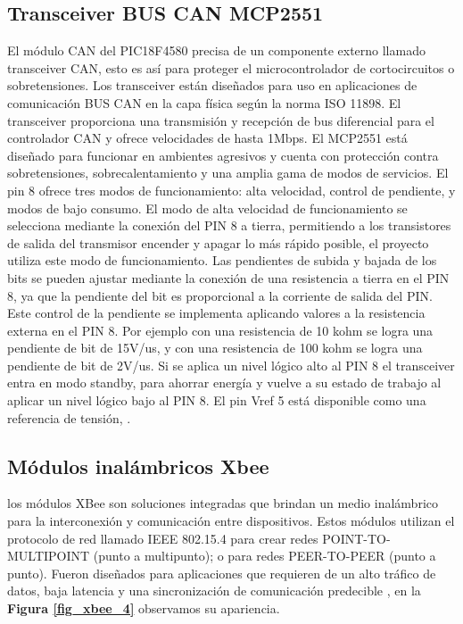 \subsection{Transceiver BUS CAN MCP2551}
El módulo CAN del  PIC18F4580 precisa de un componente externo llamado transceiver CAN, esto es así para proteger el microcontrolador de cortocircuitos o sobretensiones. Los transceiver están diseñados para uso en aplicaciones de comunicación BUS CAN en la capa física según la norma ISO 11898. El transceiver proporciona una transmisión y recepción de bus diferencial para el controlador CAN y ofrece velocidades de hasta 1Mbps.
El MCP2551 está diseñado para funcionar en ambientes agresivos y cuenta con protección contra sobretensiones, sobrecalentamiento y una amplia gama de modos de servicios. El pin 8 ofrece tres modos de funcionamiento: alta velocidad, control de pendiente, y modos de bajo consumo.
El modo de alta velocidad de funcionamiento se selecciona mediante la conexión del PIN 8 a tierra, permitiendo a los transistores de salida del transmisor encender y apagar lo más rápido posible, el proyecto utiliza este modo de funcionamiento.
Las pendientes de subida y bajada de los bits se pueden ajustar mediante la conexión de una resistencia a tierra en el PIN 8, ya que la pendiente del bit es proporcional a la corriente de salida del PIN. Este control de la pendiente se implementa aplicando valores a la resistencia externa en el PIN 8. Por ejemplo con una resistencia de 10 kohm se logra una pendiente de bit de 15V/us,  y con una resistencia de 100 kohm se logra una pendiente de bit de 2V/us. Si se aplica un nivel lógico alto al PIN 8 el transceiver entra en modo standby, para ahorrar energía y vuelve a su estado de trabajo al aplicar un nivel lógico bajo al PIN 8. El pin Vref 5 está disponible como una referencia de tensión, \cite{sn}.

\subsection{Módulos inalámbricos Xbee}
 los módulos XBee son soluciones integradas que brindan un medio inalámbrico para la interconexión y comunicación entre dispositivos. Estos módulos utilizan el protocolo de red llamado IEEE 802.15.4 para crear redes POINT-TO-MULTIPOINT (punto a multipunto); o para redes PEER-TO-PEER (punto a punto). Fueron diseñados para aplicaciones que requieren de un alto tráfico de datos, baja latencia y una sincronización de comunicación predecible \cite{xbee_c4}, en la \textbf{Figura \ref{fig_xbee_4}} observamos su apariencia. 
 
